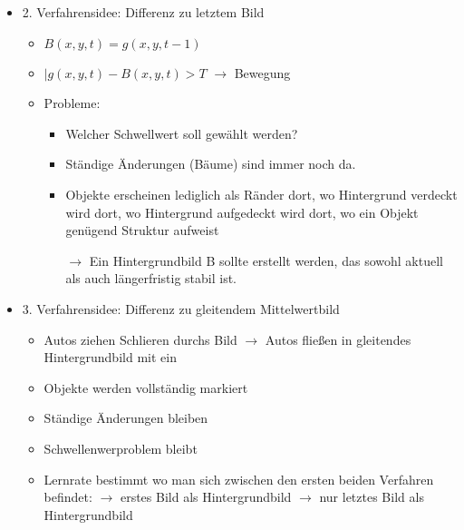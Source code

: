 \documentclass{report}
\begin{document}
\begin{itemize}
\begin{itemize}
		\end{itemize}
	
		\item 2. Verfahrensidee: Differenz zu letztem Bild
		\begin{itemize}
			\item $B(x, y, t) = g(x, y, t-1)$
			\item $|g(x, y, t) - B(x, y, t) > T$ $\rightarrow$ Bewegung
			\item Probleme:
			\begin{itemize}
				\item Welcher Schwellwert soll gewählt werden?
				\item Ständige Änderungen (Bäume) sind immer noch da.
				\item Objekte erscheinen lediglich als Ränder
				\newline dort, wo Hintergrund verdeckt wird
				\newline dort, wo Hintergrund aufgedeckt wird
				\newline dort, wo ein Objekt genügend Struktur aufweist
				\item[$\rightarrow$] Ein Hintergrundbild B sollte erstellt werden, das sowohl aktuell als auch längerfristig stabil ist.
			\end{itemize}
		\end{itemize}
	
		\item 3. Verfahrensidee: Differenz zu gleitendem Mittelwertbild
		\begin{itemize}
			\item Autos ziehen Schlieren durchs Bild $\rightarrow$ Autos fließen in gleitendes Hintergrundbild mit ein
			\item Objekte werden vollständig markiert
			\item Ständige Änderungen bleiben
			\item Schwellenwerproblem bleibt
			\item Lernrate bestimmt wo man sich zwischen den ersten beiden Verfahren befindet:
			 $\rightarrow$ erstes Bild als Hintergrundbild
			 $\rightarrow$ nur letztes Bild als Hintergrundbild
		\end{itemize}
		

\end{itemize}
\end{document}
